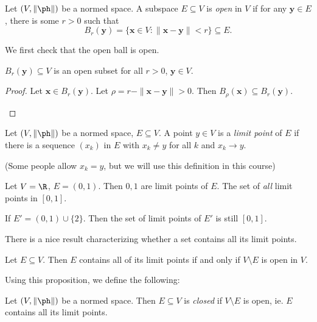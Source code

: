 \documentclass[a4paper]{article}
\begin{document}
\begin{defi}
  Let $(V, \|\ph\|)$ be a normed space. A subspace $E\subseteq V$ is \emph{open} in $V$ if for any $\mathbf{y} \in E$, there is some $r > 0$ such that
  \[
    B_r(\mathbf{y}) = \{\mathbf{x}\in V: \|\mathbf{x} - \mathbf{y}\| < r\} \subseteq E.
  \]
\end{defi}

We first check that the open ball is open.
\begin{prop}
  $B_r(\mathbf{y})\subseteq V$ is an open subset for all $r > 0$, $\mathbf{y} \in V$.
\end{prop}

\begin{proof}
  Let $\mathbf{x} \in B_r(\mathbf{y})$. Let $\rho = r - \|\mathbf{x} - \mathbf{y}\| > 0$. Then $B_\rho(\mathbf{x}) \subseteq B_r(\mathbf{y})$.
  \begin{center}
  \end{center}
\end{proof}

\begin{defi}
  Let $(V, \|\ph\|)$ be a normed space, $E\subseteq V$. A point $y \in V$ is a \emph{limit point} of $E$ if there is a sequence $(x_k)$ in $E$ with $x_k \not= y$ for all $k$ and $x_k \to y$.
\end{defi}
(Some people allow $x_k = y$, but we will use this definition in this course)

\begin{eg}
  Let $V = \R$, $E = (0, 1)$. Then $0, 1$ are limit points of $E$. The set of \emph{all} limit points in $[0, 1]$.

  If $E' = (0, 1) \cup \{2\}$. Then the set of limit points of $E'$ is still $[0, 1]$.
\end{eg}

There is a nice result characterizing whether a set contains all its limit points.
\begin{prop}
  Let $E\subseteq V$. Then $E$ contains all of its limit points if and only if $V\setminus E$ is open in $V$.
\end{prop}

Using this proposition, we define the following:
\begin{defi}
  Let $(V, \|\ph\|)$ be a normed space. Then $E\subseteq V$ is \emph{closed} if $V\setminus E$ is open, ie. $E$ contains all its limit points.
\end{defi}
\end{document}
